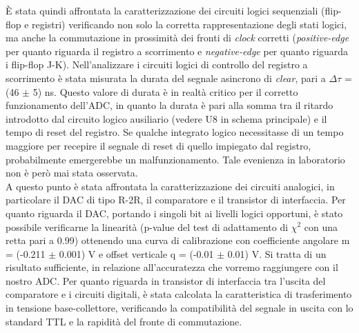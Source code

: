 \documentclass[journal]{IEEEtran}
\begin{document}
È stata quindi affrontata la caratterizzazione dei circuiti logici sequenziali (flip-flop e registri) verificando non solo la corretta rappresentazione degli stati logici, ma anche la commutazione in prossimità dei fronti di \textit{clock} corretti (\textit{positive-edge} per quanto riguarda il registro a scorrimento e \textit{negative-edge} per quanto riguarda i flip-flop J-K). Nell'analizzare i circuiti logici di controllo del registro a scorrimento è stata misurata la durata del segnale asincrono di \textit{clear}, pari a $\Delta\tau$ = (46 $\pm$ 5) ns. Questo valore di durata è in realtà critico per il corretto funzionamento dell'ADC, in quanto la durata è pari alla somma tra il ritardo introdotto dal circuito logico ausiliario (vedere U8 in schema principale) e il tempo di reset del registro. Se qualche integrato logico necessitasse di un tempo maggiore per recepire il segnale di reset di quello impiegato dal registro, probabilmente emergerebbe un malfunzionamento. Tale evenienza in laboratorio non è però mai stata osservata.
\\

A questo punto è stata affrontata la caratterizzazione dei circuiti analogici, in particolare il DAC di tipo R-2R, il comparatore e il transistor di interfaccia. Per quanto riguarda il DAC, portando i singoli bit ai livelli logici opportuni, è stato possibile verificarne la linearità (p-value del test di adattamento di $\chi^2$ con una retta pari a 0.99) ottenendo una curva di calibrazione con coefficiente angolare m = (-0.211 $\pm$ 0.001) V e offset verticale q = (-0.01 $\pm$ 0.01) V. Si tratta di un risultato sufficiente, in relazione all'accuratezza che vorremo raggiungere con il nostro ADC. Per quanto riguarda in transistor di interfaccia tra l'uscita del comparatore e i circuiti digitali, è stata calcolata la caratteristica di trasferimento in tensione base-collettore, verificando la compatibilità del segnale in uscita con lo standard TTL e la rapidità del fronte di commutazione. 
\\
\end{document}
